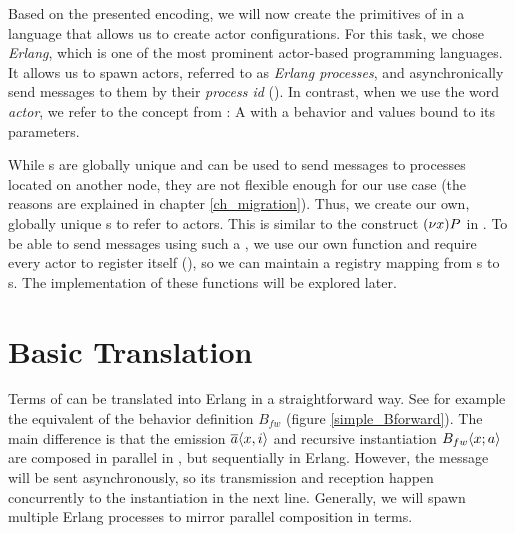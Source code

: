 Based on the presented encoding,
we will now create the primitives of \corejoincalc
in a language that allows us to create actor configurations.
For this task, we chose \emph{Erlang},
which is one of the most prominent actor-based programming languages.
It allows us to spawn actors, referred to as \emph{Erlang processes},
and asynchronically send messages to them by their \emph{process id} (\PID).
In contrast, when we use the word \emph{actor},
we refer to the concept from \actorpicalc:
A \actorname with a behavior and values bound to its parameters.

While \PID{}s are globally unique and can be used to send messages to
processes located on another node,
they are not flexible enough for our use case
(the reasons are explained in chapter \ref{ch_migration}).
Thus, we create our own, globally unique \actorname{}s to refer to actors.
This is similar to the construct $\anew{x}{P}$ in \actorpicalc.
To be able to send messages using such a \actorname,
we use our own  function and require every actor to register itself
(),
so we can maintain a registry mapping from \actorname{}s to \PID{}s.
The implementation of these functions will be explored later.


\section{Basic Translation}

Terms of \actorpicalc can be translated into Erlang in a straightforward way.
See for example the equivalent of the behavior definition $B_{fw}$
(figure \ref{simple_Bforward}).
The main difference is that the emission $\overline{a}\langle x,i\rangle$
and recursive instantiation $B_{fw} \langle x ; a \rangle$
are composed in parallel in \actorpicalc,
but sequentially in Erlang.
However, the message will be sent asynchronously,
so its transmission and reception happen concurrently to the instantiation
in the next line.
Generally, we will spawn multiple Erlang processes to
mirror parallel composition in \actorpicalc terms.











